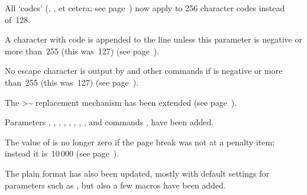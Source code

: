 \itemlist{}
\item All `codes' (, , et cetera;
    see page~\pgref[codename])
    now apply to 256 character codes instead of~128.
\item A character with code 
    is appended to the line unless this parameter is negative
or more than~255 (this was~127) (see page~).
\item No escape character is output by  and
    other commands if  is negative or more than~255
(this was~127) (see page~).
\item The \ver>^^> replacement mechanism has been extended
    (see page~\pgref[hathat]).
\item Parameters , ,
    , , ,
, , ,
and commands , 
have been added.
\item The value of  is no longer zero
 \alt
    if the page break was not at a penalty item;
    instead it is~$10\,000$ (see page~).
\>

The plain format has also been updated, mostly
\alt
with default settings for parameters such as
, but also a few macros have been added.

\endinput
